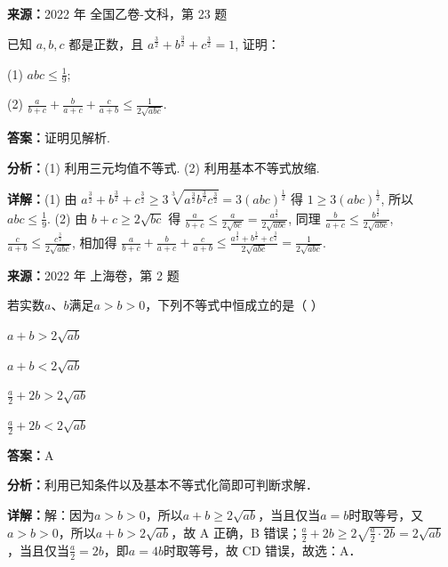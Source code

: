 \begin{question}[points=10]
\textbf{来源：}2022 年 全国乙卷-文科，第 23 题\par
[选修4-5：不等式选讲]

已知 $a,b,c$ 都是正数，且 $a^{\frac32}+b^{\frac32}+c^{\frac32}=1$, 证明：

(1) $abc \le \frac19$;

(2) $\frac{a}{b+c}+\frac{b}{a+c}+\frac{c}{a+b} \le \frac{1}{2\sqrt{abc}}$.
\begin{solution}
\textbf{答案：}证明见解析.

\textbf{分析：}(1) 利用三元均值不等式.
(2) 利用基本不等式放缩.

\textbf{详解：}(1) 由 $a^{\frac32}+b^{\frac32}+c^{\frac32} \ge 3\sqrt[3]{a^{\frac32}b^{\frac32}c^{\frac32}} = 3(abc)^{\frac12}$ 得 $1 \ge 3(abc)^{\frac12}$, 所以 $abc \le \frac19$.
(2) 由 $b+c\ge2\sqrt{bc}$ 得 $\frac{a}{b+c} \le \frac{a}{2\sqrt{bc}} = \frac{a^{\frac32}}{2\sqrt{abc}}$, 同理 $\frac{b}{a+c} \le \frac{b^{\frac32}}{2\sqrt{abc}}$, $\frac{c}{a+b} \le \frac{c^{\frac32}}{2\sqrt{abc}}$, 相加得 $\frac{a}{b+c}+\frac{b}{a+c}+\frac{c}{a+b} \le \frac{a^{\frac32}+b^{\frac32}+c^{\frac32}}{2\sqrt{abc}} = \frac{1}{2\sqrt{abc}}$.
\end{solution}
\end{question}

\begin{question}[points=5]
\textbf{来源：}2022 年 上海卷，第 2 题\par
若实数$a$、$b$满足$a>b>0$，下列不等式中恒成立的是（ ）
\begin{choices}
  \item $a+b>2\sqrt{ab}$
  \item $a+b<2\sqrt{ab}$
  \item $\frac{a}{2}+2b>2\sqrt{ab}$
  \item $\frac{a}{2}+2b<2\sqrt{ab}$
\end{choices}
\begin{solution}
\textbf{答案：}A

\textbf{分析：}利用已知条件以及基本不等式化简即可判断求解．

\textbf{详解：}解：因为$a>b>0$，所以$a+b\geq 2\sqrt{ab}$，当且仅当$a=b$时取等号，又$a>b>0$，所以$a+b>2\sqrt{ab}$，故 A 正确，B 错误；$\frac{a}{2}+2b\geq 2\sqrt{\frac{a}{2}\cdot 2b}=2\sqrt{ab}$，当且仅当$\frac{a}{2}=2b$，即$a=4b$时取等号，故 CD 错误，故选：A．
\end{solution}
\end{question}

